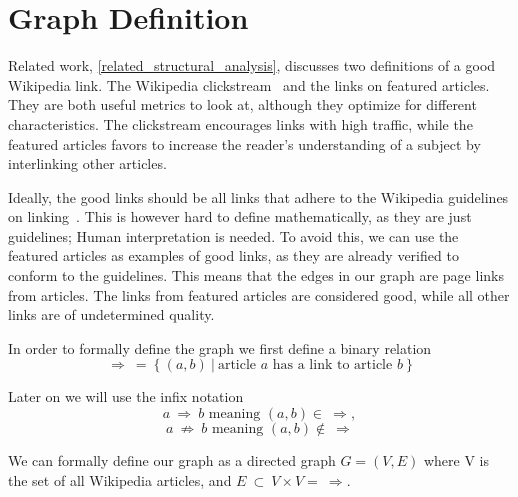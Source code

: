 \section{Graph Definition}

Related work, \cref{related_structural_analysis}, discusses two definitions of a good Wikipedia link. The Wikipedia clickstream~\cite{wiki-clickstream} and the links on featured articles. They are both useful metrics to look at, although they optimize for different characteristics. The clickstream encourages links with high traffic, while the featured articles favors to increase the reader's understanding of a subject by interlinking other articles.

Ideally, the good links should be all links that adhere to the Wikipedia guidelines on linking~\cite{wiki-manual-of-style-guidelines}. This is however hard to define mathematically, as they are just guidelines; Human interpretation is needed. To avoid this, we can use the featured articles as examples of good links, as they are already verified to conform to the guidelines. This means that the edges in our graph are page links from articles. The links from featured articles are considered good, while all other links are of undetermined quality.

In order to formally define the graph we first define a binary relation $$\Rightarrow\ =\ \{\ (a,b)\ |\ \text{article } a \text{ has a link to article } b\ \}$$

Later on we will use the infix notation $$a\ \Rightarrow\ b \text{ meaning } (a,b) \in\ \Rightarrow,$$ $$a\ \not\Rightarrow\ b \text{ meaning } (a,b) \not\in\ \Rightarrow$$

We can formally define our graph as a directed graph $G = (V,E)$ where V is the set of all Wikipedia articles, and $E\ \subset\ V \times V =\ \Rightarrow$.

